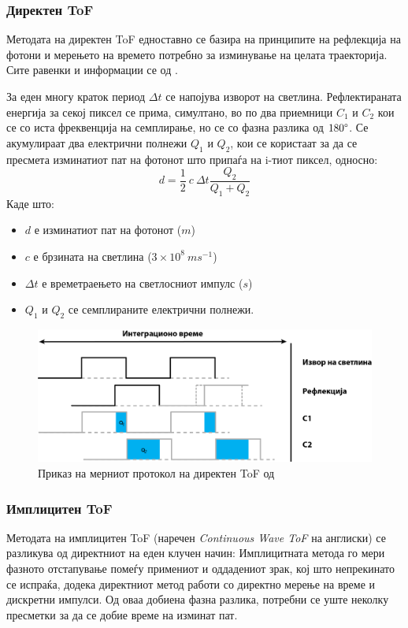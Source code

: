 \documentclass[12pt]{article}
\begin{document}
	  \subsubsection{Директен ToF}

		Методата на директен ToF едноставно се базира на принципите на рефлекција на фотони и мерењето на времето потребно за изминување на целата траекторија. Сите равенки и информации се од \cite{tofwhitepaper}.

		За еден многу краток период $ \Delta t $ се напојува изворот на светлина. Рефлектираната енергија за секој пиксел се прима, симултано, во по два приемници $C_1$ и $C_2$ кои се со иста фреквенција на семплирање, но се со фазна разлика од $180 \degree$. Се акумулираат два електрични полнежи $Q_1$ и  $Q_2$, кои се користаат за да се пресмета изминатиот пат на фотонот што припаѓа на i-тиот пиксел, односно:
		$$ d = \frac{1}{2} \ c\  \Delta t \frac{Q_2}{Q_1 + Q_2} $$
		Каде што:
		\begin{itemize}
			\item $d$ е изминатиот пат на фотонот ($m$)
			\item $c$ е брзината на светлина ($ 3 \times 10^8\ ms^{-1} $)
			\item $\Delta t$ е времетраењето на светлосниот импулс ($s$)
			\item $Q_1$ и $Q_2$ се семплираните електрични полнежи.
			\end{itemize}

		\begin{figure}[H]
			\includegraphics[width=0.75\linewidth]{./images/impulseToF.png}
			\centering
			\caption{Приказ на мерниот протокол на директен ToF од \cite{tofwhitepaper}}
			\label{fig:impulseToF.png}
			\end{figure}

	     \subsubsection{Имплицитен ToF}
		Методата на имплицитен ToF (наречен \textit{Continuous Wave ToF} на англиски) се разликува од директниот на еден клучен начин: Имплицитната метода го мери фазното отстапување помеѓу примениот и оддадениот зрак, кој што непрекинато се испраќа, додека директниот метод работи со директно мерење на време и дискретни импулси. Од оваа добиена фазна разлика, потребни се уште неколку пресметки за да се добие време на изминат пат.
\end{document}
